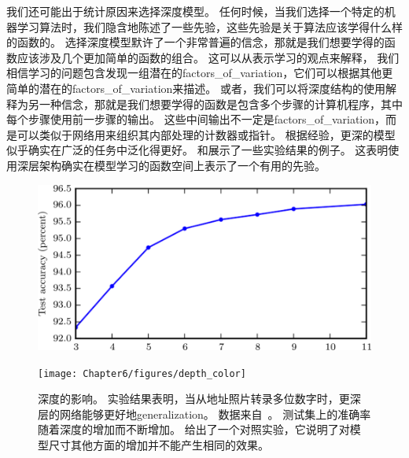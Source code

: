 我们还可能出于统计原因来选择深度模型。
任何时候，当我们选择一个特定的机器学习算法时，我们隐含地陈述了一些先验，这些先验是关于算法应该学得什么样的函数的。
选择深度模型默许了一个非常普遍的信念，那就是我们想要学得的函数应该涉及几个更加简单的函数的组合。
这可以从表示学习的观点来解释， 我们相信学习的问题包含发现一组潜在的\gls{factors_of_variation}，它们可以根据其他更简单的潜在的\gls{factors_of_variation}来描述。
或者，我们可以将深度结构的使用解释为另一种信念，那就是我们想要学得的函数是包含多个步骤的计算机程序，其中每个步骤使用前一步骤的输出。
这些中间输出不一定是\gls{factors_of_variation}，而是可以类似于网络用来组织其内部处理的计数器或指针。
根据经验，更深的模型似乎确实在广泛的任务中泛化得更好\citep{Bengio-et-al-2007,Erhan-et-al-2009,Bengio-2009,Mesnil-et-al-2011,Ciresan-et-al-2012,Krizhevsky-et-al-2012,Sermanet-et-al-2013,Farabet-et-al-2013,Couprie-et-al-2013,Kahou-et-al-2013,Goodfellow-et-al-2014d,Szegedy-et-al-2014a}。
和展示了一些实验结果的例子。
这表明使用深层架构确实在模型学习的函数空间上表示了一个有用的先验。
\begin{figure}[!htb]
\ifOpenSource
\centerline{\includegraphics[scale=0.5]{images/48.png}}
\else
\centerline{\texttt{[image: Chapter6/figures/depth\_color]}}
\fi
\caption{深度的影响。
实验结果表明，当从地址照片转录多位数字时，更深层的网络能够更好地\gls{generalization}。
数据来自~\cite{Goodfellow-et-al-2014d}。
测试集上的准确率随着深度的增加而不断增加。
给出了一个对照实验，它说明了对模型尺寸其他方面的增加并不能产生相同的效果。}
\label{fig:chap6_depth_color}
\end{figure}

